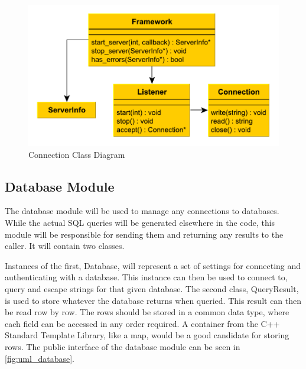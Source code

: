 \begin{figure}[ht]
\includegraphics[scale=1]{img/connection.pdf}
\caption{Connection Class Diagram}
\label{fig:uml_connection}
\end{figure}

\subsection{Database Module}

The database module will be used to manage any connections to databases. While the actual SQL queries will be generated elsewhere in the code,
this module will be responsible for sending them and returning any results to the caller. It will contain two classes.

Instances of the first, Database, will represent a set of settings for connecting and authenticating with a database. This instance can then be used to connect to, query and escape strings for that given database.
The second class, QueryResult, is used to store whatever the database returns when queried. This result can then be read row by row. The rows should be stored in a common data type,
where each field can be accessed in any order required. A container from the C++ Standard Template Library, like a map, would be a good candidate for storing rows.
The public interface of the database module can be seen in \autoref{fig:uml_database}.

